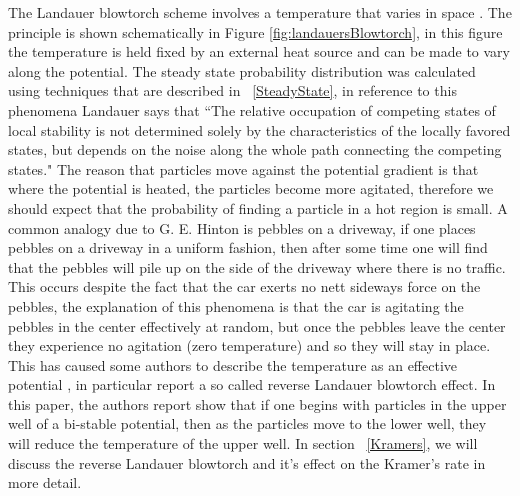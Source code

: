 The Landauer blowtorch scheme involves a temperature that varies in space \cite{Landauer1988}. The principle is shown schematically in Figure \ref{fig:landauersBlowtorch}, in this figure the temperature is held fixed by an external heat source and can be made to vary along the potential. The steady state probability distribution was calculated using techniques that are described in ~\autoref{SteadyState}, in reference to this phenomena Landauer says that \cite{Landauer1988} ``The relative occupation of competing states of local stability is not determined solely by the characteristics of the locally favored states, but depends on the noise along the whole path connecting the competing states." The reason that particles move against the potential gradient is that where the potential is heated, the particles become more agitated, therefore we should expect that the probability of finding a particle in a hot region is small. A common analogy due to G. E. Hinton is pebbles on a driveway, if one places pebbles on a driveway in a uniform fashion, then after some time one will find that the pebbles will pile up on the side of the driveway where there is no traffic. This occurs despite the fact that the car exerts no nett sideways force on the pebbles, the explanation of this phenomena is that the car is agitating the pebbles in the center effectively at random, but once the pebbles leave the center they experience no agitation (zero temperature) and so they will stay in place. This has caused some authors to describe the temperature as an effective potential \cite{Gardiner2009, Kampen1988}, in particular \cite{DasDasBarikEtAl2015} report a so called reverse Landauer blowtorch effect. In this paper, the authors report show that if one begins with particles in the upper well of a bi-stable potential, then as the particles move to the lower well, they will reduce the temperature of the upper well. In section ~\autoref{Kramers}, we will discuss the reverse Landauer blowtorch and it's effect on the Kramer's rate in more detail.

